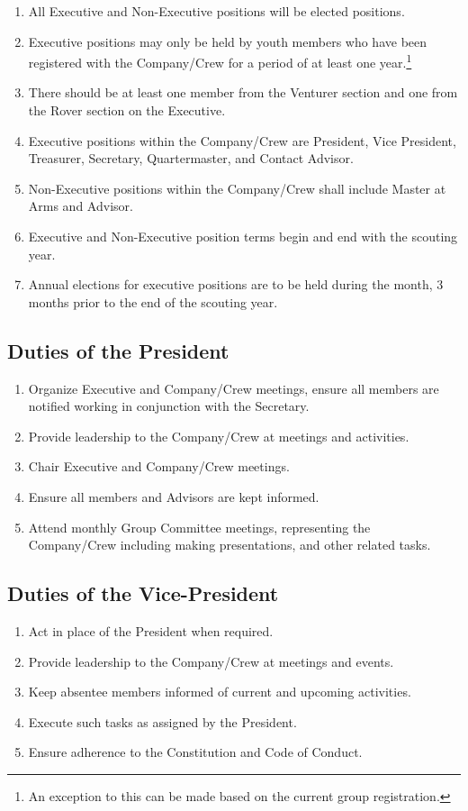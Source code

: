 \begin{enumerate}
    \item All Executive and Non-Executive positions will be elected positions.
    \item Executive positions may only be held by youth members who have been registered with the Company/Crew for a period of at least one year.\footnote{An exception to this can be made based on the current group registration.}
    \item There should be at least one member from the Venturer section and one from the Rover section on the Executive.\footnotemark[\value{footnote}]
    \item Executive positions within the Company/Crew are President, Vice President, Treasurer, Secretary, Quartermaster, and Contact Advisor.
    \item Non-Executive positions within the Company/Crew shall include Master at Arms and Advisor.
    \item Executive and Non-Executive position terms begin and end with the scouting year.
    \item Annual elections for executive positions are to be held during the month, 3 months prior to the end of the scouting year.
\end{enumerate}

\subsection{Duties of the President}\label{subsec:duties-of-the-president}
\begin{enumerate}
    \item Organize Executive and Company/Crew meetings, ensure all members are notified working in conjunction with the Secretary.
    \item Provide leadership to the Company/Crew at meetings and activities.
    \item Chair Executive and Company/Crew meetings.
    \item Ensure all members and Advisors are kept informed.
    \item Attend monthly Group Committee meetings, representing the Company/Crew including making presentations, and other related tasks.
\end{enumerate}

\subsection{Duties of the Vice-President}\label{subsec:duties-of-the-vice-president}
\begin{enumerate}
    \item Act in place of the President when required.
    \item Provide leadership to the Company/Crew at meetings and events.
    \item Keep absentee members informed of current and upcoming activities.
    \item Execute such tasks as assigned by the President.
    \item Ensure adherence to the Constitution and Code of Conduct.
\end{enumerate}

